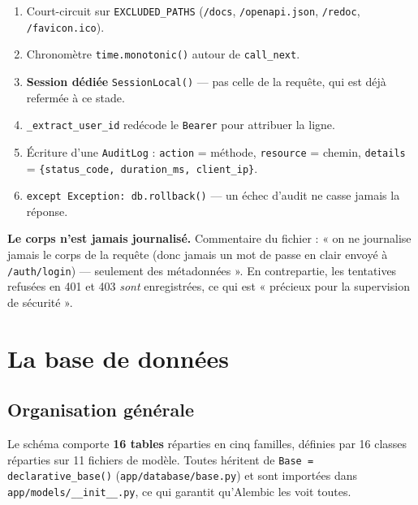 \documentclass[11pt,a4paper]{report}
\newcommand{\file}[1]{\texttt{\small #1}}
\newcommand{\fn}[1]{\texttt{\small\textcolor{oasisviolet}{#1}}}
\newcommand{\cls}[1]{\texttt{\small\textcolor{oasisblue}{#1}}}
\newcommand{\route}[1]{\texttt{\small\textcolor{oasisgreen}{#1}}}
\begin{document}
\begin{enumerate}
  \item Court-circuit sur \texttt{EXCLUDED\_PATHS} (\file{/docs},
  \file{/openapi.json}, \file{/redoc}, \file{/favicon.ico}).
  \item Chronomètre \texttt{time.monotonic()} autour de \fn{call\_next}.
  \item \textbf{Session dédiée} \fn{SessionLocal()} --- pas celle de la requête,
  qui est déjà refermée à ce stade.
  \item \fn{\_extract\_user\_id} redécode le \texttt{Bearer} pour attribuer la
  ligne.
  \item Écriture d'une \cls{AuditLog} : \texttt{action} = méthode,
  \texttt{resource} = chemin, \texttt{details} =
  \texttt{\{status\_code, duration\_ms, client\_ip\}}.
  \item \texttt{except Exception: db.rollback()} --- un échec d'audit ne casse
  jamais la réponse.
\end{enumerate}

\begin{keybox}
\textbf{Le corps n'est jamais journalisé.} Commentaire du fichier : « on ne
journalise jamais le corps de la requête (donc jamais un mot de passe en clair
envoyé à \route{/auth/login}) --- seulement des métadonnées ». En contrepartie,
les tentatives refusées en 401 et 403 \emph{sont} enregistrées, ce qui est
« précieux pour la supervision de sécurité ».
\end{keybox}

\chapter{La base de données}
\label{ch:db}

\section{Organisation générale}

Le schéma comporte \textbf{16 tables} réparties en cinq familles, définies par
16 classes réparties sur 11 fichiers de modèle. Toutes héritent de
\fn{Base = declarative\_base()} (\file{app/database/base.py}) et sont importées
dans \file{app/models/\_\_init\_\_.py}, ce qui garantit qu'Alembic les voit
toutes.
\end{document}
